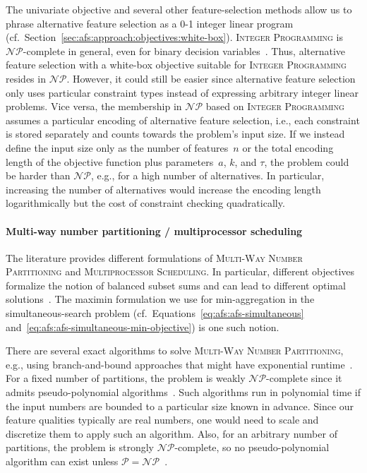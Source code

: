 \documentclass{article}
\theoremstyle{definition}
\begin{document}
The univariate objective and several other feature-selection methods allow us to phrase alternative feature selection as a 0-1 integer linear program (cf.~Section~\ref{sec:afs:approach:objectives:white-box}).
\textsc{Integer Programming} is $\mathcal{NP}$-complete in general, even for binary decision variables~\cite{garey2003computers, karp1972reducibility}.
Thus, alternative feature selection with a white-box objective suitable for \textsc{Integer Programming} resides in $\mathcal{NP}$.
However, it could still be easier since alternative feature selection only uses particular constraint types instead of expressing arbitrary integer linear problems.
Vice versa, the membership in $\mathcal{NP}$ based on \textsc{Integer Programming} assumes a particular encoding of alternative feature selection, i.e., each constraint is stored separately and counts towards the problem's input size.
If we instead define the input size only as the number of features~$n$ or the total encoding length of the objective function plus parameters~$a$, $k$, and $\tau$, the problem could be harder than $\mathcal{NP}$, e.g., for a high number of alternatives.
In particular, increasing the number of alternatives would increase the encoding length logarithmically but the cost of constraint checking quadratically.

\paragraph{Multi-way number partitioning / multiprocessor scheduling}

The literature provides different formulations of \textsc{Multi-Way Number Partitioning} and \textsc{Multiprocessor Scheduling}.
In particular, different objectives formalize the notion of balanced subset sums and can lead to different optimal solutions~\cite{korf2010objective, lawrinenko2017identical}.
The maximin formulation we use for min-aggregation in the simultaneous-search problem (cf.~Equations~\ref{eq:afs:afs-simultaneous} and~\ref{eq:afs:afs-simultaneous-min-objective}) is one such notion.

There are several exact algorithms to solve \textsc{Multi-Way Number Partitioning}, e.g., using branch-and-bound approaches that might have exponential runtime~\cite{haouari2008maximizing, schreiber2018optimal, walter2017improved}.
For a fixed number of partitions, the problem is weakly $\mathcal{NP}$-complete since it admits pseudo-polynomial algorithms~\cite{garey2003computers, korf2009multi}.
Such algorithms run in polynomial time if the input numbers are bounded to a particular size known in advance.
Since our feature qualities typically are real numbers, one would need to scale and discretize them to apply such an algorithm.
Also, for an arbitrary number of partitions, the problem is strongly $\mathcal{NP}$-complete, so no pseudo-polynomial algorithm can exist unless $\mathcal{P}=\mathcal{NP}$~\cite{garey2003computers}.
\end{document}
